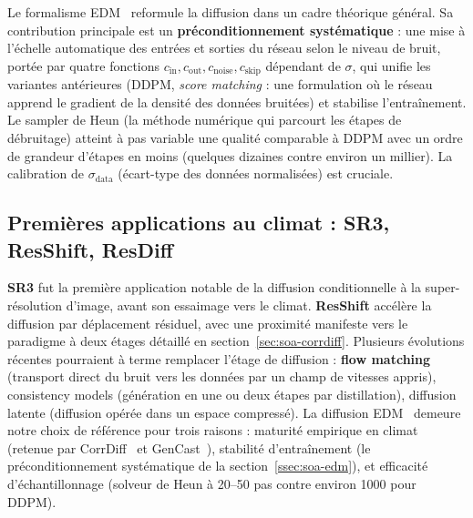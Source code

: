 Le formalisme EDM~\cite{karras_edm_2022} reformule la diffusion dans un cadre théorique général. Sa contribution principale est un \textbf{préconditionnement systématique} : une mise à l'échelle automatique des entrées et sorties du réseau selon le niveau de bruit, portée par quatre fonctions $c_{\mathrm{in}}, c_{\mathrm{out}}, c_{\mathrm{noise}}, c_{\mathrm{skip}}$ dépendant de $\sigma$, qui unifie les variantes antérieures (DDPM, \emph{score matching} : une formulation où le réseau apprend le gradient de la densité des données bruitées) et stabilise l'entraînement. Le sampler de Heun (la méthode numérique qui parcourt les étapes de débruitage) atteint à pas variable une qualité comparable à DDPM avec un ordre de grandeur d'étapes en moins (quelques dizaines contre environ un millier). La calibration de $\sigma_{\mathrm{data}}$ (écart-type des données normalisées) est cruciale.

\subsection{Premières applications au climat : SR3, ResShift, ResDiff}
\label{ssec:soa-sr3-resdiff}

\textbf{SR3} fut la première application notable de la diffusion conditionnelle à la super-résolution d'image, avant son essaimage vers le climat. \textbf{ResShift} accélère la diffusion par déplacement résiduel, avec une proximité manifeste vers le paradigme à deux étages détaillé en section~\ref{sec:soa-corrdiff}. Plusieurs évolutions récentes pourraient à terme remplacer l'étage de diffusion : \textbf{flow matching}~\cite{lipman_flow_2023} (transport direct du bruit vers les données par un champ de vitesses appris), consistency models (génération en une ou deux étapes par distillation), diffusion latente (diffusion opérée dans un espace compressé). La diffusion EDM~\cite{karras_edm_2022} demeure notre choix de référence pour trois raisons : maturité empirique en climat (retenue par CorrDiff~\cite{mardani_corrdiff_2023} et GenCast~\cite{price_gencast_2024}), stabilité d'entraînement (le préconditionnement systématique de la section~\ref{ssec:soa-edm}), et efficacité d'échantillonnage (solveur de Heun à 20--50 pas contre environ 1000 pour DDPM).\label{ssec:soa-flow-matching}

\label{sec:soa-corrdiff}

